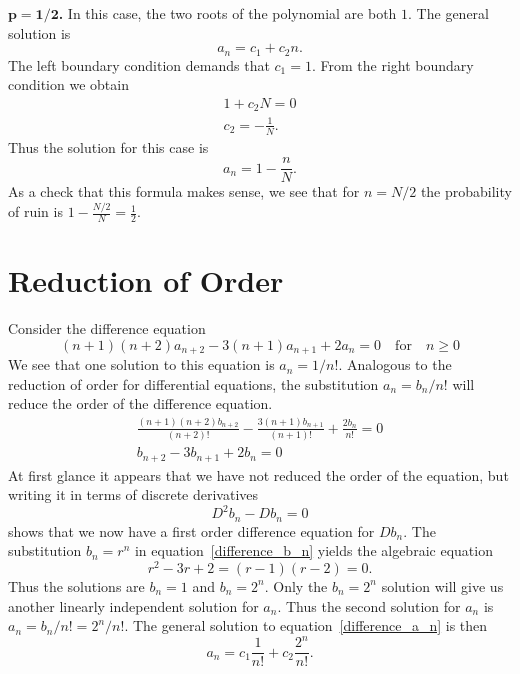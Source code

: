 \begin{Example}
\begin{description}
  \item{$\mathbf{p \boldsymbol{=} 1 \boldsymbol{/} 2}$\textbf{.}}
    In this case, the two roots of the polynomial are both $1$.  The 
    general solution is
    \[ a_n = c_1 + c_2 n.\]
    The left boundary condition demands that $c_1 = 1$.  From the right 
    boundary condition we obtain
    \begin{gather*}
      1 + c_2 N = 0 \\
      c_2 = -\frac{1}{N}.
    \end{gather*}
    Thus the solution for this case is
    \[ \boxed{a_n = 1 - \frac{n}{N}.} \]
    As a check that this formula makes sense, 
    we see that for $n = N/2$ the probability of ruin is 
    $1 - \frac{N/2}{N} = \frac{1}{2}$.
  \end{description}
\end{Example}





\section{Reduction of Order}
Consider the difference equation
\begin{equation} \label{difference_a_n}
  (n+1)(n+2)a_{n+2}-3(n+1)a_{n+1}+2a_n = 0\quad \mathrm{for}\quad n \geq 0 
\end{equation}
We see that one solution to this equation is $a_n = 1/n!$.
Analogous to the reduction of order for differential equations, the substitution
$a_n = b_n / n!$ will reduce the order of the difference equation.
\begin{gather}
  \frac{(n+1)(n+2)b_{n+2}}{(n+2)!} - \frac{3(n+1)b_{n+1}}{(n+1)!} 
  + \frac{2b_n}{n!} = 0 \nonumber \\
  b_{n+2} - 3b_{n+1} + 2b_n = 0 \label{difference_b_n}
\end{gather}
At first glance it appears that we have not reduced the order of the equation,
but writing it in terms of discrete derivatives
\[D^2 b_n - D b_n = 0 \]
shows that we now have a first order difference equation for $D b_n$.
The substitution $b_n = r^n$ in equation~\ref{difference_b_n} yields the
algebraic equation
\[r^2 - 3r + 2 = (r-1)(r-2) = 0.\]
Thus the solutions are $b_n = 1$ and $b_n = 2^n$.  Only the $b_n=2^n$ 
solution will give us another linearly independent solution for $a_n$. 
Thus the second solution for $a_n$ is $a_n = b_n / n! = 2^n / n!$.
The general solution to equation~\ref{difference_a_n} is then
\[\boxed{ a_n = c_1 \frac{1}{n!} + c_2 \frac{2^n}{n!}. } \]


